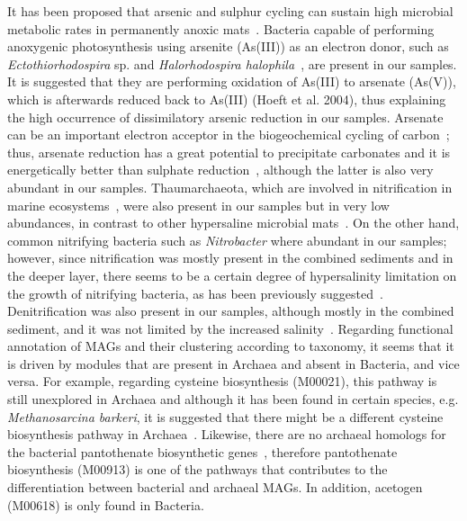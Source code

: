    It has been proposed that arsenic and sulphur cycling can sustain high microbial metabolic rates in permanently anoxic mats~\citep{visscher_modern_2020}. 
   Bacteria capable of performing anoxygenic photosynthesis using arsenite (As(III)) as an electron donor, 
   such as \textit{Ectothiorhodospira} sp. and \textit{Halorhodospira halophila}~\citep{hoeft_mccann_arsenite_2017}, are present in our samples. 
   It is suggested that they are performing oxidation of As(III) to arsenate (As(V)), which is afterwards reduced back to As(III) (Hoeft et al. 2004), 
   thus explaining the high occurrence of dissimilatory arsenic reduction in our samples. 
   Arsenate can be an important electron acceptor in the biogeochemical cycling of carbon~\citep{oremland_bacterial_2000}; 
   thus, arsenate reduction has a great potential to precipitate carbonates and it is energetically better than sulphate reduction~\citep{visscher_modern_2020}, 
   although the latter is also very abundant in our samples. 
   Thaumarchaeota, which are involved in nitrification in marine ecosystems~\citep{veuger_nitrification_2013}, 
   were also present in our samples but in very low abundances, in contrast to other hypersaline microbial mats~\citep{ruvindy_unravelling_2016}. 
   On the other hand, common nitrifying bacteria such as \textit{Nitrobacter} where abundant in our samples; 
   however, since nitrification was mostly present in the combined sediments and in the deeper layer, 
   there seems to be a certain degree of hypersalinity limitation on the growth of nitrifying bacteria, 
   as has been previously suggested~\citep{jeffries_increases_2012}. 
   Denitrification was also present in our samples, although mostly in the combined sediment, and it was not limited by 
   the increased salinity~\citep{laverman_potential_2007}. 
   Regarding functional annotation of MAGs and their clustering according to taxonomy, 
   it seems that it is driven by modules that are present in Archaea and absent in Bacteria, and vice versa. 
   For example, regarding cysteine biosynthesis (M00021), this pathway is still unexplored in Archaea 
   and although it has been found in certain species, e.g. \textit{Methanosarcina barkeri}, 
   it is suggested that there might be a different cysteine biosynthesis pathway in Archaea~\citep*{kitabatake_cysteine_2000}. 
   Likewise, there are no archaeal homologs for the bacterial pantothenate biosynthetic genes~\citep{ronconi_novel_2008}, 
   therefore pantothenate biosynthesis (M00913) is one of the pathways that contributes 
   to the differentiation between bacterial and archaeal MAGs. 
   In addition, acetogen (M00618) is only found in Bacteria.


